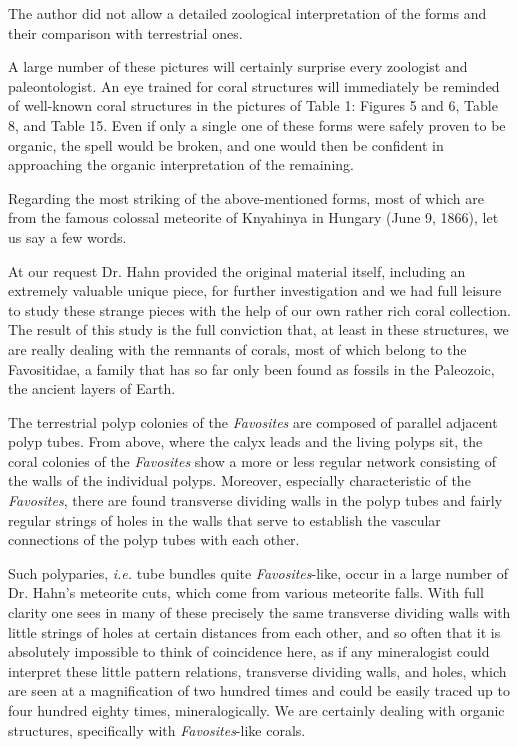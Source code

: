\documentclass[a4paper, 12pt, oneside]{article}
\begin{document}
The author did not allow a detailed zoological interpretation of the forms and their comparison with terrestrial ones.

A large number of these pictures will certainly surprise every zoologist and paleontologist. An eye trained for coral structures will immediately be reminded of well-known coral structures in the pictures of Table 1: Figures 5 and 6, Table 8, and Table 15. Even if only a single one of these forms were safely proven to be organic, the spell would be broken, and one would then be confident in approaching the organic interpretation of the remaining.

Regarding the most striking of the above-mentioned forms, most of which are from the famous colossal meteorite of Knyahinya in Hungary (June 9, 1866), let us say a few words.

At our request Dr. Hahn provided the original material itself, including an extremely valuable unique piece, for further investigation and we had full leisure to study these strange pieces with the help of our own rather rich coral collection. The result of this study is the full conviction that, at least in these structures, we are really dealing with the remnants of corals, most of which belong to the Favositidae, a family that has so far only been found as fossils in the Paleozoic, the ancient layers of Earth.

The terrestrial polyp colonies of the \emph{Favosites} are composed of parallel adjacent polyp tubes. From above, where the calyx leads and the living polyps sit, the coral colonies of the \emph{Favosites} show a more or less regular network consisting of the walls of the individual polyps. Moreover, especially characteristic of the \emph{Favosites}, there are found transverse dividing walls in the polyp tubes and fairly regular strings of holes in the walls that serve to establish the vascular connections of the polyp tubes with each other.

Such polyparies, \emph{i.e.} tube bundles quite \emph{Favosites}-like, occur in a large number of Dr. Hahn's meteorite cuts, which come from various meteorite falls. With full clarity one sees in many of these precisely the same transverse dividing walls with little strings of holes at certain distances from each other, and so often that it is absolutely impossible to think of coincidence here, as if any mineralogist could interpret these little pattern relations, transverse dividing walls, and holes, which are seen at a magnification of two hundred times and could be easily traced up to four hundred eighty times, mineralogically. We are certainly dealing with organic structures, specifically with \emph{Favosites}-like corals.
\end{document}
